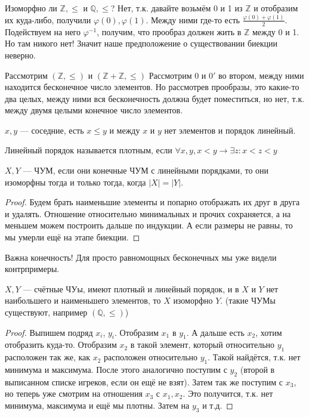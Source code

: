 Изоморфно ли $\mathbb{Z}, \le$ и $\mathbb{Q}, \le$? Нет, т.к. давайте возьмём 0 и 1 из $\mathbb{Z}$ и отобразим их куда-либо, получили $\varphi(0), \varphi(1)$. Между ними где-то есть $\frac{\varphi(0) + \varphi(1)}{2}$. Подействуем на него $\varphi^{-1}$, получим, что прообраз должен жить в $\mathbb{Z}$ между 0 и 1. Но там никого нет! Значит наше предположение о существовании биекции неверно.

Рассмотрим $(\mathbb{Z}, \le)$ и $(\mathbb{Z} + \mathbb{Z}, \le)$ Рассмотрим 0 и $0'$ во втором, между ними находится бесконечное число элементов. Но рассмотрев прообразы, это какие-то два целых, между ними вся бесконечность должна будет поместиться, но нет, т.к. между двумя целыми конечное число элементов.

\begin{definition}
$x, y$ --- соседние, есть $x \le y$ и между $x$ и $y$ нет элементов и порядок линейный.
\end{definition}
\begin{definition}
Линейный порядок называется плотным, если $\forall x, y, x < y \to \exists z : x < z < y$
\end{definition}

\begin{theorem}
$X, Y$ --- ЧУМ, если они конечные ЧУМ с линейными порядками, то они изоморфны тогда и только тогда, когда $|X| = |Y|$. 
\end{theorem}
\begin{proof}
Будем брать наименьшие элементы и попарно отображать их друг в друга и удалять. Отношение относительно минимальных и прочих сохраняется, а на меньшем можем построить дальше по индукции. А если размеры не равны, то мы умерли ещё на этапе биекции.
\end{proof}
\begin{remark}
	Важна конечность! Для просто равномощных бесконечных мы уже видели контрпримеры. 
\end{remark}

\begin{theorem}
	$X, Y$ --- счётные ЧУы, имеют плотный и линейный  порядок, и в $X$ и $Y$ нет наибольшего и наименьшего элементов, то $X$ изоморфно $Y$. (такие ЧУМы существуют, например $(\mathbb{Q}, \le)$)
\end{theorem}
\begin{proof}
	Выпишем подряд $x_i$, $y_i$. Отобразим $x_1$ в $y_1$. А дальше есть $x_2$, хотим отобразить куда-то. Отобразим $x_2$ в такой элемент, который относительно $y_1$ расположен так же, как $x_2$ расположен относительно $y_1$.
	Такой найдётся, т.к. нет минимума и максимума. После этого аналогично поступим с $y_2$ (второй в выписанном списке игреков, если он ещё не взят). Затем так же поступим с $x_3$, но теперь уже смотрим на отношения $x_3$ с $x_1, x_2$. Это получится, т.к. нет минимума, максимума и ещё мы плотны. Затем на $y_3$ и т.д.
\end{proof}
